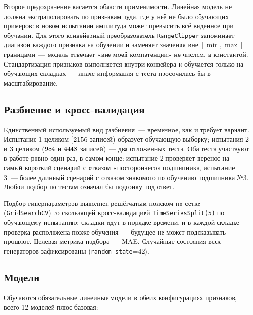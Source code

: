\documentclass[14pt,a4paper]{extarticle}
\begin{document}
Второе предохранение касается области применимости. Линейная модель не должна
экстраполировать по признакам туда, где у неё не было обучающих примеров:
в новом испытании амплитуда может превысить всё виденное при обучении.
Для этого конвейерный преобразователь \texttt{RangeClipper} запоминает
диапазон каждого признака на обучении и заменяет значения вне $[\min, \max]$
границами~--- модель отвечает «вне моей компетенции» не числом, а константой.
Стандартизация признаков выполняется внутри конвейера и обучается только
на обучающих складках~--- иначе информация с теста просочилась бы
в масштабирование.

\subsection{Разбиение и кросс-валидация}

Единственный используемый вид разбиения~--- временное, как и требует вариант.
Испытание 1 целиком ($2156$ записей) образует обучающую выборку;
испытания 2 и 3 целиком ($984$ и $4448$ записей)~--- два
отложенных теста. Оба теста участвуют в работе ровно один раз, в самом
конце: испытание 2 проверяет перенос на самый короткий сценарий с отказом
«постороннего» подшипника, испытание 3~--- более длинный сценарий
с отказом знакомого по обучению подшипника №3. Любой подбор по тестам
означал бы подгонку под ответ.

Подбор гиперпараметров выполнен решётчатым поиском по сетке
(\texttt{Grid\-Search\-CV})
со скользящей кросс-валидацией \texttt{Time\-Series\-Split(5)} по обучающему
испытанию: складки идут в порядке времени, и в каждой складке проверка
расположена позже обучения~--- будущее не может подсказывать прошлое.
Целевая метрика подбора~--- MAE. Случайные состояния всех генераторов
зафиксированы (\texttt{random\_state}=42).

\subsection{Модели}

Обучаются обязательные линейные модели в обеих конфигурациях признаков,
всего 12 моделей плюс базовая:
\end{document}
